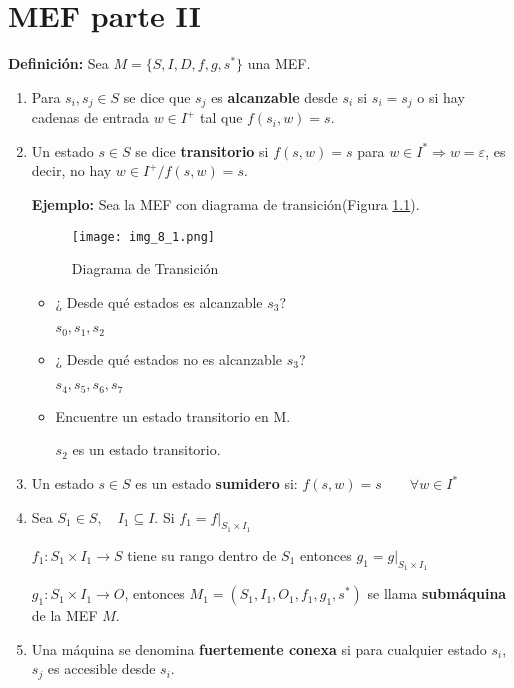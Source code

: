 \chapter{MEF parte II}

\textbf{Definición: }Sea $M=\{S,I,D,f,g,s^*\}$ una MEF.

\begin{enumerate}
\item Para $s_i,s_j\in S$ se dice que $s_j$ es \textbf{alcanzable} desde $s_i$ si $s_i=s_j$ o si hay cadenas de entrada $w\in I^+$ tal que $f(s_i,w)=s$.
\item Un estado $s\in S$ se dice \textbf{transitorio} si $f(s,w)=s$ para $w\in I^* \Rightarrow w=\varepsilon$, es decir, no hay $w\in I^+ /f(s,w)=s$.


\textbf{Ejemplo: }Sea la MEF con diagrama de transición(Figura \ref{img_8_1}).

\begin{figure}[h!]
\centering
\texttt{[image: img\_8\_1.png]}
\caption{Diagrama de Transición}\label{img_8_1}
\end{figure}

\begin{itemize}
\item ¿ Desde qué estados es alcanzable $s_3$?
	
	$s_0,s_1,s_2$
\item ¿ Desde qué estados no es alcanzable $s_3$?

	$s_4,s_5,s_6,s_7$
\item Encuentre un estado transitorio en M.

	$s_2$ es un estado transitorio.
\end{itemize}

\item Un estado $s\in S$ es un estado \textbf{sumidero} si: $f(s,w)=s\qquad \forall w\in I^*$

\item Sea $S_1\in S, \quad I_1 \subseteq I$. Si $ f_1=f|_{S_1\times I_1}$

	$f_1:S_1\times I_1\rightarrow S$ tiene su rango dentro de $S_1$ entonces $g_1=g|_{S_1\times I_1}$
	
	$g_1: S_1\times I_1 \rightarrow O$, entonces $M_1=(S_1,I_1,O_1,f_1,g_1,s^*)$ se llama \textbf{submáquina} de la MEF $M$.
	
\item Una máquina se denomina \textbf{fuertemente conexa} si para cualquier estado $s_i$, $s_j$ es accesible desde $s_i$.


\end{enumerate}
